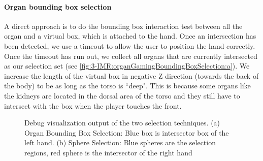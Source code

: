 \paragraph{Organ bounding box selection}
A direct approach is to do the bounding box interaction test between all the organ and a virtual box, which is attached to the hand. 
Once an intersection has been detected, we use a timeout to allow the user to position the hand correctly. Once the timeout has run out, we collect all organs that are currently intersected as our selection set (see \figurename{\ref{fig:3-IMR:organGamingBoundingBoxSelection:a}}).
We increase the length of the virtual box in negative Z direction (towards the back of the body) to be as long as the torso is ``deep". This is because some organs like the kidneys are located in the dorsal area of the torso and they still have to intersect with the box when the player touches the front.

\begin{figure}[htb]
	\centering
	\caption{Debug visualization output of the two selection techniques. (a) Organ Bounding Box Selection: Blue box is intersector box of the left hand. (b) Sphere Selection: Blue spheres are the selection regions, red sphere is the intersector of the right hand}
	\label{fig:3-IMR:organGamingBoundingBoxSelection}
\end{figure}
